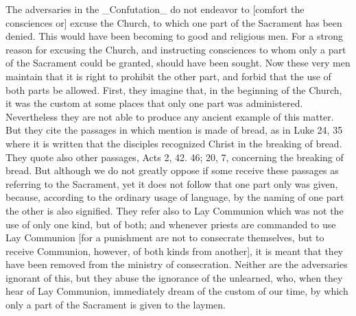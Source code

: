 The adversaries in the _Confutation_ do not endeavor to [comfort the
consciences or] excuse the Church, to which one part of the Sacrament
has been denied.  This would have been becoming to good and religious
men.  For a strong reason for excusing the Church, and instructing
consciences to whom only a part of the Sacrament could be granted,
should have been sought.  Now these very men maintain that it is
right to prohibit the other part, and forbid that the use of both
parts be allowed.  First, they imagine that, in the beginning of the
Church, it was the custom at some places that only one part was
administered.  Nevertheless they are not able to produce any ancient
example of this matter.  But they cite the passages in which mention
is made of bread, as in Luke 24, 35 where it is written that the
disciples recognized Christ in the breaking of bread.  They quote
also other passages, Acts 2, 42. 46; 20, 7, concerning the breaking
of bread.  But although we do not greatly oppose if some receive
these passages as referring to the Sacrament, yet it does not follow
that one part only was given, because, according to the ordinary
usage of language, by the naming of one part the other is also
signified.  They refer also to Lay Communion which was not the use of
only one kind, but of both; and whenever priests are commanded to use
Lay Communion [for a punishment are not to consecrate themselves, but
to receive Communion, however, of both kinds from another], it is
meant that they have been removed from the ministry of consecration.
Neither are the adversaries ignorant of this, but they abuse the
ignorance of the unlearned, who, when they hear of Lay Communion,
immediately dream of the custom of our time, by which only a part of
the Sacrament is given to the laymen.

